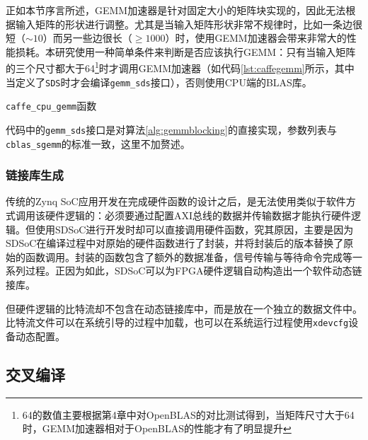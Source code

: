 
正如本节序言所述，GEMM加速器是针对固定大小的矩阵块实现的，因此无法根据输入矩阵的形状进行调整。尤其是当输入矩阵形状非常不规律时，比如一条边很短（$\sim 10$）而另一些边很长（$\geq 1000$）时，使用GEMM加速器会带来非常大的性能损耗。本研究使用一种简单条件来判断是否应该执行GEMM：只有当输入矩阵的三个尺寸都大于64\footnote{64的数值主要根据第4章中对OpenBLAS的对比测试得到，当矩阵尺寸大于64时，GEMM加速器相对于OpenBLAS的性能才有了明显提升}时才调用GEMM加速器（如代码\ref{lst:caffegemm}所示，其中当定义了\texttt{SDS}时才会编译\texttt{gemm\_sds}接口），否则使用CPU端的BLAS库。

\begin{listing}[!ht]

\caption{\texttt{caffe\_cpu\_gemm}函数}
\label{lst:caffegemm}
\end{listing}

代码中的\texttt{gemm\_sds}接口是对算法\ref{alg:gemmblocking}的直接实现，参数列表与\texttt{cblas\_sgemm}的标准一致，这里不加赘述。

\subsubsection{链接库生成}

传统的Zynq SoC应用开发在完成硬件函数的设计之后，是无法使用类似于软件方式调用该硬件逻辑的：必须要通过配置AXI总线的数据并传输数据才能执行硬件逻辑。但使用SDSoC进行开发时却可以直接调用硬件函数，究其原因，主要是因为SDSoC在编译过程中对原始的硬件函数进行了封装，并将封装后的版本替换了原始的函数调用。封装的函数包含了额外的数据准备，信号传输与等待命令完成等一系列过程。正因为如此，SDSoC可以为FPGA硬件逻辑自动构造出一个软件动态链接库。

但硬件逻辑的比特流却不包含在动态链接库中，而是放在一个独立的数据文件中。比特流文件可以在系统引导的过程中加载，也可以在系统运行过程使用\texttt{xdevcfg}设备动态配置。

\subsection{交叉编译}

